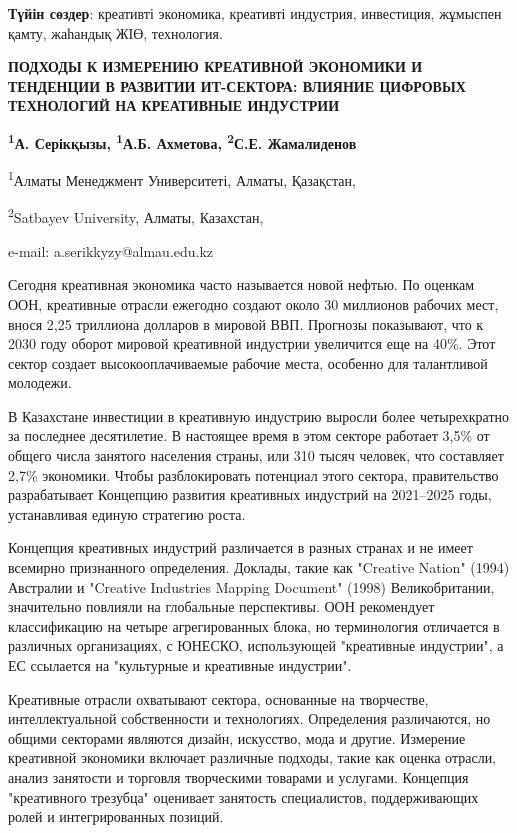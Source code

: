 {\bfseries Түйін сөздер}: креативті экономика, креативті индустрия,
инвестиция, жұмыспен қамту, жаһандық ЖІӨ, технология.

\begin{center}
{\large\bfseries ПОДХОДЫ К ИЗМЕРЕНИЮ КРЕАТИВНОЙ ЭКОНОМИКИ И ТЕНДЕНЦИИ В РАЗВИТИИ
ИТ-СЕКТОРА: ВЛИЯНИЕ ЦИФРОВЫХ ТЕХНОЛОГИЙ НА КРЕАТИВНЫЕ ИНДУСТРИИ}

{\bfseries \textsuperscript{1}А. Серікқызы, \textsuperscript{1}А.Б.
Ахметова, \textsuperscript{2}С.Е. Жамалиденов}

\textsuperscript{1}Алматы Менеджмент Университеті, Алматы, Қазақстан,

\textsuperscript{2}Satbayev University, Алматы, Казахстан,

e-mail: a.serikkyzy@almau.edu.kz
\end{center}

Сегодня креативная экономика часто называется новой нефтью. По оценкам
ООН, креативные отрасли ежегодно создают около 30 миллионов рабочих
мест, внося 2,25 триллиона долларов в мировой ВВП. Прогнозы показывают,
что к 2030 году оборот мировой креативной индустрии увеличится еще на
40\%. Этот сектор создает высокооплачиваемые рабочие места, особенно для
талантливой молодежи.

В Казахстане инвестиции в креативную индустрию выросли более
четырехкратно за последнее десятилетие. В настоящее время в этом секторе
работает 3,5\% от общего числа занятого населения страны, или 310 тысяч
человек, что составляет 2,7\% экономики. Чтобы разблокировать потенциал
этого сектора, правительство разрабатывает Концепцию развития креативных
индустрий на 2021--2025 годы, устанавливая единую стратегию роста.

Концепция креативных индустрий различается в разных странах и не имеет
всемирно признанного определения. Доклады, такие как "Creative Nation"
(1994) Австралии и "Creative Industries Mapping Document" (1998)
Великобритании, значительно повлияли на глобальные перспективы. ООН
рекомендует классификацию на четыре агрегированных блока, но
терминология отличается в различных организациях, с ЮНЕСКО, использующей
"креативные индустрии", а ЕС ссылается на "культурные и креативные
индустрии".

Креативные отрасли охватывают сектора, основанные на творчестве,
интеллектуальной собственности и технологиях. Определения различаются,
но общими секторами являются дизайн, искусство, мода и другие. Измерение
креативной экономики включает различные подходы, такие как оценка
отрасли, анализ занятости и торговля творческими товарами и услугами.
Концепция "креативного трезубца" оценивает занятость специалистов,
поддерживающих ролей и интегрированных позиций.

